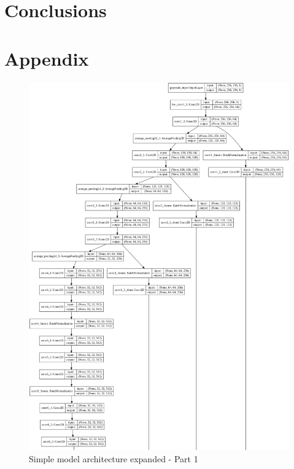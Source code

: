 \documentclass[12pt,openright,twoside,a4paper,english]{abntex2}
\begin{document}
\begin{otherlanguage}{english}
\chapter{Conclusions}


\chapter{Appendix}

\begin{figure}[!htb]
\centering
\includegraphics[height=\textheight]{model_plot/Simple1}
\caption{Simple model architecture expanded - Part 1}
\label{simple_plot_1}
\end{figure}


\end{otherlanguage}
\end{document}
